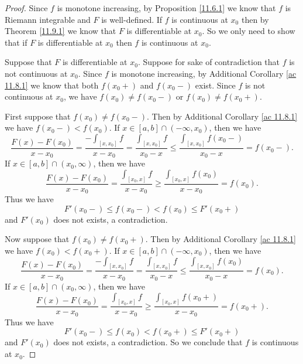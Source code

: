 \begin{proof}
    Since \(f\) is monotone increasing, by Proposition \ref{11.6.1} we know that \(f\) is Riemann integrable and \(F\) is well-defined.
    If \(f\) is continuous at \(x_0\) then by Theorem \ref{11.9.1} we know that \(F\) is differentiable at \(x_0\).
    So we only need to show that if \(F\) is differentiable at \(x_0\) then \(f\) is continuous at \(x_0\).

    Suppose that \(F\) is differentiable at \(x_0\).
    Suppose for sake of contradiction that \(f\) is not continuous at \(x_0\).
    Since \(f\) is monotone increasing, by Additional Corollary \ref{ac 11.8.1} we know that both \(f(x_0+)\) and \(f(x_0-)\) exist.
    Since \(f\) is not continuous at \(x_0\), we have \(f(x_0) \neq f(x_0-)\) or \(f(x_0) \neq f(x_0+)\).

    First suppose that \(f(x_0) \neq f(x_0-)\).
    Then by Additional Corollary \ref{ac 11.8.1} we have \(f(x_0-) < f(x_0)\).
    If \(x \in [a, b] \cap (-\infty, x_0)\), then we have
    \[
        \frac{F(x) - F(x_0)}{x - x_0} = \frac{-\int_{[x, x_0]} f}{x - x_0} = \frac{\int_{[x, x_0]} f}{x_0 - x} \leq \frac{\int_{[x, x_0]} f(x_0-)}{x_0 - x} = f(x_0-).
    \]
    If \(x \in [a, b] \cap (x_0, \infty)\), then we have
    \[
        \frac{F(x) - F(x_0)}{x - x_0} = \frac{\int_{[x_0, x]} f}{x - x_0} \geq \frac{\int_{[x_0, x]} f(x_0)}{x - x_0} = f(x_0).
    \]
    Thus we have
    \[
        F'(x_0-) \leq f(x_0-) < f(x_0) \leq F'(x_0+)
    \]
    and \(F'(x_0)\) does not exists, a contradiction.

    Now suppose that \(f(x_0) \neq f(x_0+)\).
    Then by Additional Corollary \ref{ac 11.8.1} we have \(f(x_0) < f(x_0+)\).
    If \(x \in [a, b] \cap (-\infty, x_0)\), then we have
    \[
        \frac{F(x) - F(x_0)}{x - x_0} = \frac{-\int_{[x, x_0]} f}{x - x_0} = \frac{\int_{[x, x_0]} f}{x_0 - x} \leq \frac{\int_{[x, x_0]} f(x_0)}{x_0 - x} = f(x_0).
    \]
    If \(x \in [a, b] \cap (x_0, \infty)\), then we have
    \[
        \frac{F(x) - F(x_0)}{x - x_0} = \frac{\int_{[x_0, x]} f}{x - x_0} \geq \frac{\int_{[x_0, x]} f(x_0+)}{x - x_0} = f(x_0+).
    \]
    Thus we have
    \[
        F'(x_0-) \leq f(x_0) < f(x_0+) \leq F'(x_0+)
    \]
    and \(F'(x_0)\) does not exists, a contradiction.
    So we conclude that \(f\) is continuous at \(x_0\).
\end{proof}
